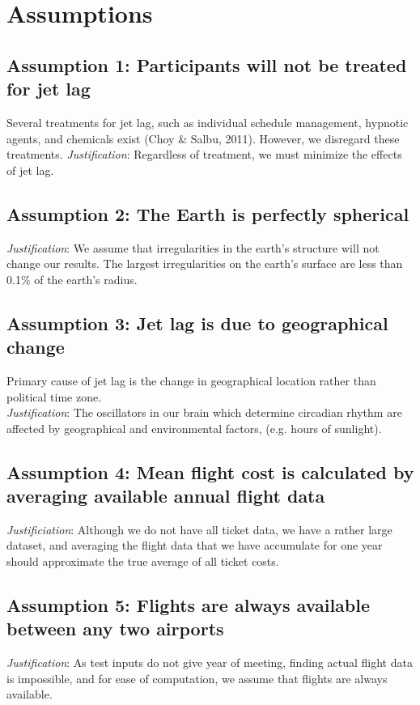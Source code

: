 \section{Assumptions}
\subsection*{Assumption 1: Participants will not be treated for jet lag}
Several treatments for jet lag, such as individual schedule management, hypnotic agents, and chemicals exist (Choy \& Salbu, 2011). However, we disregard these treatments.
\textit{Justification}: Regardless of treatment, we must minimize the effects of jet lag.  

\subsection*{Assumption 2: The Earth is perfectly spherical}
\textit{Justification}: We assume that irregularities in the earth’s structure will not change our results. The largest irregularities on the earth’s surface are less than 0.1\% of the earth’s radius.

\subsection*{Assumption 3: Jet lag is due to geographical change}
Primary cause of jet lag is the change in geographical location rather than political time zone.\\ 
\textit{Justification}: The oscillators in our brain which determine circadian rhythm are affected by geographical and environmental factors, (e.g. hours of sunlight).

\subsection*{Assumption 4: Mean flight cost is calculated by averaging available annual flight data}
\textit{Justificiation}: Although we do not have all ticket data, we have a rather large dataset, and averaging the flight data that we have accumulate for one year should approximate the true average of all ticket costs. 

\subsection*{Assumption 5: Flights are always available between any two airports}
\textit{Justification}: As test inputs do not give year of meeting, finding actual flight data is impossible, and for ease of computation, we assume that flights are always available.
